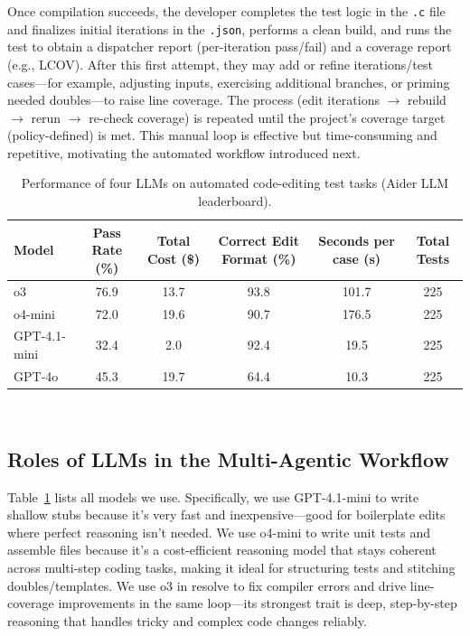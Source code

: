 \documentclass[conference]{IEEEtran}
\begin{document}
Once compilation succeeds, the developer completes the test logic in the \texttt{.c} file and finalizes initial iterations in the \texttt{.json}, performs a clean build, and runs the test to obtain a dispatcher report (per-iteration pass/fail) and a coverage report (e.g., LCOV). After this first attempt, they may add or refine iterations/test cases—for example, adjusting inputs, exercising additional branches, or priming needed doubles—to raise line coverage. The process (edit iterations $\rightarrow$ rebuild $\rightarrow$ rerun $\rightarrow$ re-check coverage) is repeated until the project’s coverage target (policy-defined) is met. This manual loop is effective but time-consuming and repetitive, motivating the automated workflow introduced next.

\begin{table}[!t]
  \centering
  \vspace{1ex}
  \begin{tabular}{lccccc}
    \hline
    \textbf{Model} & \textbf{Pass Rate (\%)} & \textbf{Total Cost (\$)} & \textbf{Correct Edit Format (\%)} & \textbf{Seconds per case (s)} & \textbf{Total Tests} \\
    \hline
    o3                          & 76.9 & 13.7 & 93.8 & 101.7 & 225 \\
    o4-mini                     & 72.0 & 19.6 & 90.7 & 176.5 & 225 \\
    GPT-4.1-mini                & 32.4 &  2.0 & 92.4 &  19.5 & 225 \\
    GPT-4o                      & 45.3 & 19.7 & 64.4 &  10.3 & 225 \\
    \hline
  \end{tabular}
  \\[4pt]
  \caption{Performance of four LLMs on automated code-editing test tasks (Aider LLM leaderboard).}
  \label{tab:llm-comparison}
\end{table}

\subsection{Roles of LLMs in the Multi-Agentic Workflow}
Table~\ref{tab:llm-comparison} lists all models we use. Specifically, we use GPT-4.1-mini to write shallow stubs because it’s very fast and inexpensive—good for boilerplate edits where perfect reasoning isn’t needed.  We use o4-mini to write unit tests and assemble files because it’s a cost-efficient reasoning model that stays coherent across multi-step coding tasks, making it ideal for structuring tests and stitching doubles/templates. We use o3 in resolve to fix compiler errors and drive line-coverage improvements in the same loop—its strongest trait is deep, step-by-step reasoning that handles tricky and complex code changes reliably.
\end{document}
